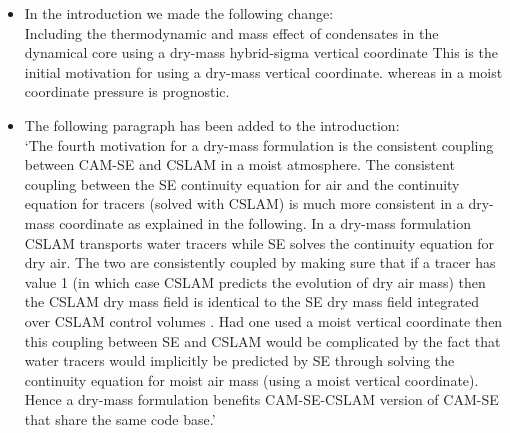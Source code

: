 \documentclass[11pt]{article}
\begin{document}
\begin{itemize}
\item In the introduction we made the following change:\\

Including the thermodynamic and mass effect of condensates in the dynamical core using a dry-mass hybrid-sigma vertical coordinate {\color{red}{is mathematically simpler due to the clear separation of dry air, water vapor and condensates in the discretization.}} This is the initial motivation for using a dry-mass vertical coordinate. {\color{red}{That said, certain parts of the implementation of a dry-mass coordinate in the dynamical core is slight more complicated since moist pressure is a diagnostic in a dry-mass vertical coordinate formulation  (mass effects of moisture and condensates need to be explicitly added)} whereas in a moist coordinate pressure is prognostic.}
\item The following paragraph has been added to the introduction:\\

`The fourth motivation for a dry-mass formulation is the consistent coupling between CAM-SE and CSLAM \cite[Conservative Semi-LAgrangian Multi-tracer scheme][]{LNU2010JCP} in a moist atmosphere. The consistent coupling between the SE continuity equation for air and the continuity equation for tracers (solved with CSLAM) is much more consistent in a dry-mass coordinate as explained in the following. In a dry-mass formulation CSLAM transports water tracers while SE solves the continuity equation for dry air. The two are consistently coupled by making sure that if a tracer has value 1 (in which case CSLAM predicts the evolution of dry air mass) then the CSLAM dry mass field is identical to the SE dry mass field integrated over CSLAM control volumes \citep[how this is done is explained in detail in ][]{LTOUNGK2017MWR}. Had one used a moist vertical coordinate then this coupling between SE and CSLAM would be complicated by the fact that water tracers would implicitly be predicted by SE through solving the continuity equation for moist air mass (using a moist vertical coordinate). Hence a dry-mass formulation benefits CAM-SE-CSLAM version of CAM-SE that share the same code base.'
\end{itemize}

{\color{blue}{
Other than the moist-mass effects, have there been any fundamental improvements to the discretization in CAM-SE? Some of the changes demonstrated in the paper are just re-configuration of runtime parameters. Figure 6 shows a major change in the kinetic energy spectrum, but this should be simply due to the new choice of parameters, and doesn't seem to be due to fundamental improvements in the solver. }}\\
\end{document}
